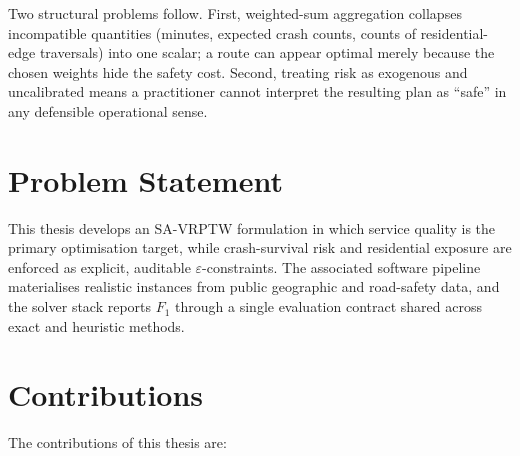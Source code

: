 Two structural problems follow. First, weighted-sum aggregation
collapses incompatible quantities (minutes, expected crash counts,
counts of residential-edge traversals) into one scalar; a route can
appear optimal merely because the chosen weights hide the safety
cost. Second, treating risk as exogenous and uncalibrated means a
practitioner cannot interpret the resulting plan as ``safe'' in any
defensible operational sense.

\section{Problem Statement}

This thesis develops an SA-VRPTW formulation in which service quality
is the primary optimisation target, while crash-survival risk and
residential exposure are enforced as explicit, auditable
$\varepsilon$-constraints. The associated software pipeline materialises
realistic instances from public geographic and road-safety data, and
the solver stack reports $F_1$ through a single evaluation contract
shared across exact and heuristic methods.

\section{Contributions}

The contributions of this thesis are:

